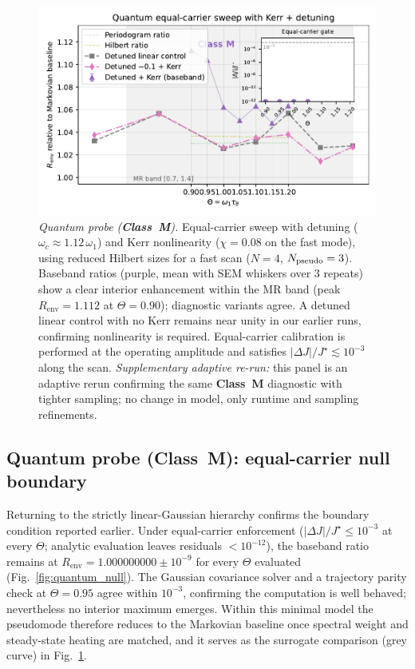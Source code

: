 \documentclass[11pt,letterpaper]{article}
\DeclareRobustCommand{\classM}{\textbf{Class~M}\xspace}
\begin{document}
\begin{figure}[t]
\centering
\includegraphics[width=0.8\linewidth]{figF_quantum_nonlin_adaptive.pdf}
\caption{\label{fig:quantum_positive}\emph{Quantum probe (\classM).} Equal-carrier sweep with detuning ($\omega_c\approx1.12\,\omega_1$) and Kerr nonlinearity ($\chi=0.08$ on the fast mode), using reduced Hilbert sizes for a fast scan ($N=4$, $N_{\rm pseudo}=3$). Baseband ratios (purple, mean with SEM whiskers over 3 repeats) show a clear interior enhancement within the MR band (peak $R_{\mathrm{env}}=1.112$ at $\Theta=0.90$); diagnostic variants agree. A detuned linear control with no Kerr remains near unity in our earlier runs, confirming nonlinearity is required. Equal-carrier calibration is performed at the operating amplitude and satisfies $|\Delta J|/J^\star\lesssim10^{-3}$ along the scan. \emph{Supplementary adaptive re-run:} this panel is an adaptive rerun confirming the same \classM{} diagnostic with tighter sampling; no change in model, only runtime and sampling refinements.}
\end{figure}

\subsection{Quantum probe (\classM): equal-carrier null boundary}
\label{sec:results_quantum}
Returning to the strictly linear-Gaussian hierarchy confirms the boundary condition reported earlier. Under equal-carrier enforcement ($|\Delta J|/J^\star \le 10^{-3}$ at every $\Theta$; analytic evaluation leaves residuals $<10^{-12}$), the baseband ratio remains at $R_{\mathrm{env}} = 1.000000000\pm 10^{-9}$ for every $\Theta$ evaluated (Fig.~\ref{fig:quantum_null}). The Gaussian covariance solver and a trajectory parity check at $\Theta=0.95$ agree within $10^{-3}$, confirming the computation is well behaved; nevertheless no interior maximum emerges. Within this minimal model the pseudomode therefore reduces to the Markovian baseline once spectral weight and steady-state heating are matched, and it serves as the surrogate comparison (grey curve) in Fig.~\ref{fig:quantum_positive}.
\end{document}
